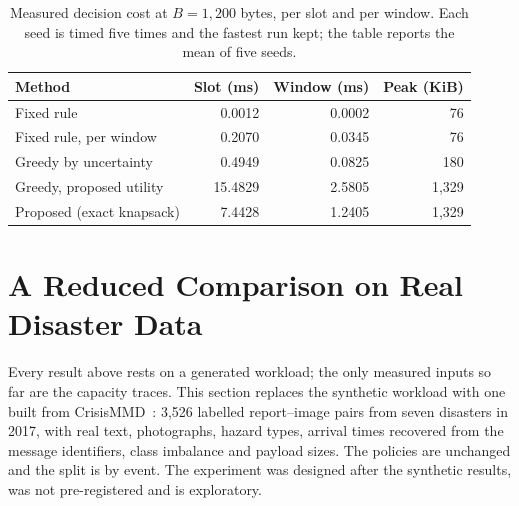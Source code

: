 \documentclass[conference,a4paper]{IEEEtran}
\newif\ifsubmission
\newcommand{\masteronly}[1]{\ifsubmission\else#1\fi}
\begin{document}
\masteronly{%
\begin{table}[t]
\caption{Measured decision cost at $B=1{,}200$ bytes, per slot and per window. Each seed is timed five times and the fastest run kept; the table reports the mean of five seeds.}
\label{tab:compute}
\centering\scriptsize\setlength{\tabcolsep}{3pt}
\begin{tabular}{@{}p{2.45cm}rrr@{}}
\toprule
Method & Slot (ms) & Window (ms) & Peak (KiB) \\
\midrule
Fixed rule & 0.0012 & 0.0002 & 76 \\
Fixed rule, per window & 0.2070 & 0.0345 & 76 \\
Greedy by uncertainty & 0.4949 & 0.0825 & 180 \\
Greedy, proposed utility & 15.4829 & 2.5805 & 1,329 \\
Proposed (exact knapsack) & 7.4428 & 1.2405 & 1,329 \\
\bottomrule
\end{tabular}
\end{table}}%


\fi
\section{A Reduced Comparison on Real Disaster Data}
\label{sec:real}
Every result above rests on a generated workload; the only measured inputs so far are the capacity traces. This section replaces the synthetic workload with one built from CrisisMMD~\cite{crisismmd}: 3,526 labelled report--image pairs from seven disasters in 2017, with real text, photographs, hazard types, arrival times recovered from the message identifiers, class imbalance and payload sizes. The policies are unchanged and the split is by event. The experiment was designed after the synthetic results, was not pre-registered and is exploratory.
\end{document}
